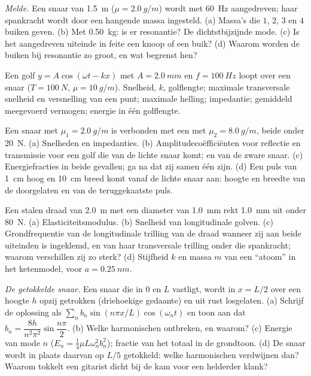 \begin{exercise}[$\star\star$]\label{exo:b2:waves-on-strings:6}
\emph{Melde.} Een snaar van \qty{1.5}{m} ($\mu = \qty{2.0}{g/m}$) wordt met
\qty{60}{Hz} aangedreven; haar spankracht wordt door een hangende massa
ingesteld. (a) Massa's die $1$, $2$, $3$ en $4$ buiken geven. (b) Met
\qty{0.50}{kg}: is er resonantie? De dichtstbijzijnde mode. (c) Is het
aangedreven uiteinde in feite een knoop of een buik? (d) Waarom worden de
buiken bij resonantie zo groot, en wat begrenst hen?
\end{exercise}

\begin{exercise}[$\star\star$]\label{exo:b2:waves-on-strings:7}
Een golf $y = A\cos(\omega t - kx)$ met $A = \qty{2.0}{mm}$ en
$f = \qty{100}{Hz}$ loopt over een snaar ($T = \qty{100}{N}$,
$\mu = \qty{10}{g/m}$). Snelheid, $k$, golflengte; maximale transversale
snelheid en versnelling van een punt; maximale helling; impedantie;
gemiddeld meegevoerd vermogen; energie in één golflengte.
\end{exercise}

\begin{exercise}[$\star\star$]\label{exo:b2:waves-on-strings:8}
Een snaar met $\mu_1 = \qty{2.0}{g/m}$ is verbonden met een met
$\mu_2 = \qty{8.0}{g/m}$, beide onder \qty{20}{N}. (a) Snelheden en
impedanties. (b) Amplitudecoëfficiënten voor reflectie en transmissie voor
een golf die van de lichte snaar komt; en van de zware snaar. (c)
Energiefracties in beide gevallen; ga na dat zij samen één zijn. (d) Een
puls van \qty{1}{cm} hoog en \qty{10}{cm} breed komt vanaf de lichte snaar
aan: hoogte en breedte van de doorgelaten en van de teruggekaatste puls.
\end{exercise}

\begin{exercise}[$\star\star$]\label{exo:b2:waves-on-strings:9}
Een stalen draad van \qty{2.0}{m} met een diameter van \qty{1.0}{mm} rekt
\qty{1.0}{mm} uit onder \qty{80}{N}. (a) Elasticiteitsmodulus. (b) Snelheid
van longitudinale golven. (c) Grondfrequentie van de longitudinale trilling
van de draad wanneer zij aan beide uiteinden is ingeklemd, en van haar
transversale trilling onder die spankracht; waarom verschillen zij zo sterk?
(d) Stijfheid $k$ en massa $m$ van een ``atoom'' in het ketenmodel, voor
$a = \qty{0.25}{nm}$.
\end{exercise}

\begin{exercise}[$\star\star\star$]\label{exo:b2:waves-on-strings:10}
\emph{De getokkelde snaar.} Een snaar die in $0$ en $L$ vastligt, wordt in
$x = L/2$ over een hoogte $h$ opzij getrokken (driehoekige gedaante) en uit
rust losgelaten. (a) Schrijf de oplossing als
$\sum_nb_n\sin(n\pi x/L)\cos(\omega_nt)$ en toon aan dat
$b_n = \dfrac{8h}{n^2\pi^2}\sin\dfrac{n\pi}2$. (b) Welke harmonischen
ontbreken, en waarom? (c) Energie van mode $n$
($E_n = \tfrac14\mu L\omega_n^2b_n^2$); fractie van het totaal in de
grondtoon. (d) De snaar wordt in plaats daarvan op $L/5$ getokkeld: welke
harmonischen verdwijnen dan? Waarom tokkelt een gitarist dicht bij de kam
voor een helderder klank?
\end{exercise}

